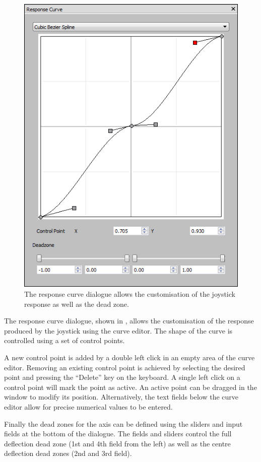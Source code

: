 \documentclass[a4, 10pt]{article}
\begin{document}
\begin{figure}[bt]
    \centering

    \includegraphics[width=0.75\linewidth]{images/action_response_curve_bezier}
    \caption{The response curve dialogue allows the customisation of the
        joystick response as well as the dead zone.}
    \label{fig:action_response_curve}
\end{figure}

The response curve dialogue, shown in ,
allows the customisation of the response produced by the joystick using
the curve editor. The shape of the curve is controlled using a set of
control points.

A new control point is added by a double left click in an empty area of
the curve editor. Removing an existing control point is achieved by
selecting the desired point and pressing the ``Delete'' key on the keyboard.
A single left click on a control point will mark the point as active. An
active point can be dragged in the window to modify its position.
Alternatively, the text fields below the curve editor allow for precise
numerical values to be entered.

Finally the dead zones for the axis can be defined using the sliders and
input fields at the bottom of the dialogue. The fields and sliders
control the full deflection dead zone (1st and 4th field from the left)
as well as the centre deflection dead zones (2nd and 3rd field).
\end{document}
